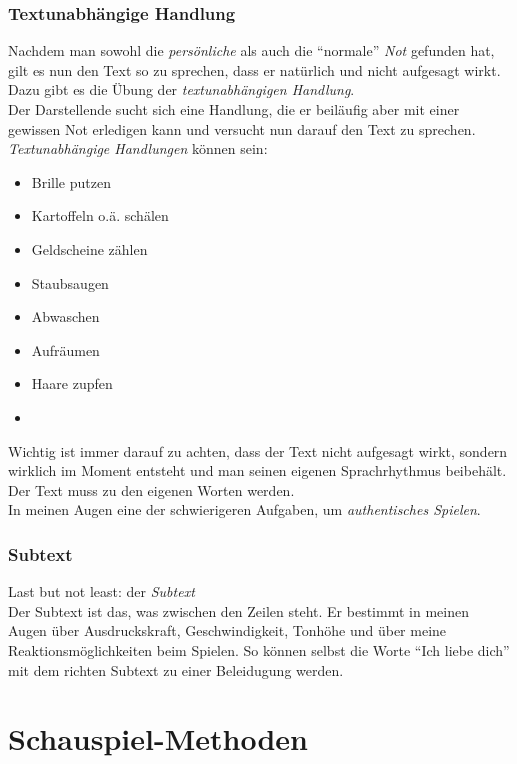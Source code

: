 \documentclass[ngerman, a4paper, twoside]{scrbook}%
\begin{document}
	 \section{Textunabhängige Handlung}
	 Nachdem man sowohl die \emph{persönliche} als auch die "`normale"' \emph{Not} gefunden hat, gilt es nun den Text so zu sprechen, dass er natürlich und nicht aufgesagt wirkt. Dazu gibt es die Übung der \emph{textunabhängigen Handlung}.\\
	 Der Darstellende sucht sich eine Handlung, die er beiläufig aber mit einer gewissen Not erledigen kann und versucht nun darauf den Text zu sprechen.\\
	 \emph{Textunabhängige Handlungen} können sein:
	 \begin{itemize}
	 	\item Brille putzen
	 	\item Kartoffeln o.ä. schälen
	 	\item Geldscheine zählen
	 	\item Staubsaugen
	 	\item Abwaschen
	 	\item Aufräumen
	 	\item Haare zupfen
	 	\item
	 \end{itemize}
	 Wichtig ist immer darauf zu achten, dass der Text nicht aufgesagt wirkt, sondern wirklich im Moment entsteht und man seinen eigenen Sprachrhythmus beibehält. Der Text muss zu den eigenen Worten werden.\\
	 In meinen Augen eine der schwierigeren Aufgaben, um \emph{authentisches Spielen}.


	 \section{Subtext}
	 Last but not least: der \emph{Subtext}\\
	 Der Subtext ist das, was zwischen den Zeilen steht. Er bestimmt in meinen Augen über Ausdruckskraft, Geschwindigkeit, Tonhöhe und über meine Reaktionsmöglichkeiten beim Spielen. So können selbst die Worte "`Ich liebe dich"' mit dem richten Subtext zu einer Beleidugung werden.



	\setcounter{chapter}{0}
	\setcounter{section}{0}
	\part{Schauspiel-Methoden}
\end{document}
